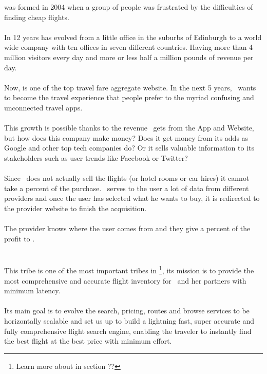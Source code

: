 \company\cite{skyscanner_strategy} was formed in 2004 when a group of people was frustrated by the difficulties of finding cheap flights.
\\\\
In 12 years has evolved from a little office in the suburbs of Edinburgh to a world wide company with ten offices in seven different countries. Having more than 4 million visitors every day and more or less half a million pounds of revenue per day.
\\\\
Now, is one of the top travel fare aggregate website. In the next 5 years, \company\ wants to become the travel experience that people prefer to the myriad confusing and unconnected travel apps.
\\\\
This growth is possible thanks to the revenue \company\ gets from the App and Website, but how does this company make money? Does it get money from its adds as Google and other top tech companies do? Or it sells valuable information to its stakeholders such as user trends like Facebook or Twitter?
\\\\
Since \company\ does not actually sell the flights (or hotel rooms or car hires) it cannot take a percent of the purchase. \company\ serves to the user a lot of data from different providers and once the user has selected what he wants to buy, it is redirected to the provider website to finish the acquisition.
\\\\
The provider knows where the user comes from and they give a percent of the profit to \company.

\section{\tribe}

This tribe\cite{marketplace_engine_home} is one of the most important tribes in \company\footnote{Learn more about \textit{} in section ??}, its mission is to provide the most comprehensive and accurate flight inventory for \company\ and her partners with minimum latency.
\\\\
Its main goal is to evolve the search, pricing, routes and browse services to be horizontally scalable and set us up to build a lightning fast, super accurate and fully comprehensive flight search engine, enabling the traveler to instantly find the best flight at the best price with minimum effort.

